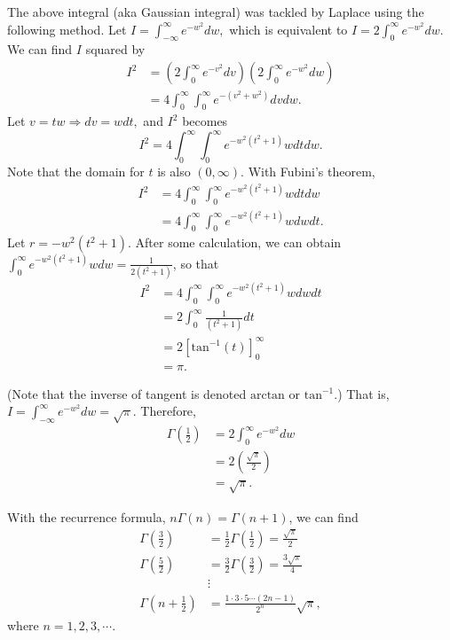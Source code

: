 \documentclass[12pt,oneside,english,american,flalign]{book}\usepackage[]{graphicx}\usepackage[]{color}
\begin{document}
The above integral (aka Gaussian integral) was tackled by Laplace
using the following method. Let $I=\int_{-\infty}^{\infty}e^{-w^{2}}dw,$
which is equivalent to $I=2\int_{0}^{\infty}e^{-w^{2}}dw$. We can
find $I$ squared by 
\begin{align*}
I^{2} & =\left(2\int_{0}^{\infty}e^{-v^{2}}dv\right)\left(2\int_{0}^{\infty}e^{-w^{2}}dw\right)\\
 & =4\int_{0}^{\infty}\int_{0}^{\infty}e^{-\left(v^{2}+w^{2}\right)}dvdw.
\end{align*}
Let $v=tw\Rightarrow dv=wdt,$ and $I^{2}$ becomes 
\[
I^{2}=4\int_{0}^{\infty}\int_{0}^{\infty}e^{-w^{2}\left(t^{2}+1\right)}wdtdw.
\]
Note that the domain for $t$ is also $\left(0,\infty\right)$. With
Fubini's theorem, 
\begin{align*}
I^{2} & =4\int_{0}^{\infty}\int_{0}^{\infty}e^{-w^{2}\left(t^{2}+1\right)}wdtdw\\
 & =4\int_{0}^{\infty}\int_{0}^{\infty}e^{-w^{2}\left(t^{2}+1\right)}wdwdt.
\end{align*}
Let $r=-w^{2}\left(t^{2}+1\right)$. After some calculation, we can
obtain $\int_{0}^{\infty}e^{-w^{2}\left(t^{2}+1\right)}wdw=\frac{1}{2\left(t^{2}+1\right)}$,
so that 
\begin{align*}
I^{2} & =4\int_{0}^{\infty}\int_{0}^{\infty}e^{-w^{2}\left(t^{2}+1\right)}wdwdt\\
 & =2\int_{0}^{\infty}\frac{1}{\left(t^{2}+1\right)}dt\\
 & =2\left[\textrm{tan}^{-1}\left(t\right)\right]_{0}^{\infty}\\
 & =\pi.
\end{align*}

\noindent (Note that the inverse of tangent is denoted $\textrm{arctan}$
or $\textrm{tan}^{-1}$.) That is, $I=\int_{-\infty}^{\infty}e^{-w^{2}}dw=\sqrt{\pi}$.
Therefore, 
\begin{align*}
\Gamma\left(\frac{1}{2}\right) & =2\int_{0}^{\infty}e^{-w^{2}}dw\\
 & =2\left(\frac{\sqrt{\pi}}{2}\right)\\
 & =\sqrt{\pi}.
\end{align*}

With the recurrence formula, $n\Gamma\left(n\right)=\Gamma\left(n+1\right)$,
we can find 
\begin{align*}
\Gamma\left(\frac{3}{2}\right) & =\frac{1}{2}\Gamma\left(\frac{1}{2}\right)=\frac{\sqrt{\pi}}{2}\\
\Gamma\left(\frac{5}{2}\right) & =\frac{3}{2}\Gamma\left(\frac{3}{2}\right)=\frac{3\sqrt{\pi}}{4}\\
 & \vdots\\
\Gamma\left(n+\frac{1}{2}\right) & =\frac{1\cdot3\cdot5\cdots\left(2n-1\right)}{2^{n}}\sqrt{\pi},
\end{align*}
where $n=1,2,3,\cdots$.
\end{document}
